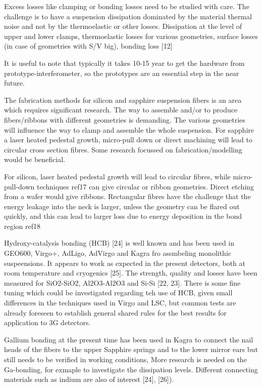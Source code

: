 Excess losses like clamping or bonding losses need to be studied with care. The challenge is to have a suspension dissipation dominated by the material thermal noise and not by the thermoelastic or other losses. Dissipation at the level of upper and lower clamps, thermoelastic losses for various geometries, surface losses (in case of geometries with S/V big), bonding loss [12]

It is useful to note that typically it takes 10-15 year to get the hardware from prototype-interferometer, so the prototypes are an essential step in the near future.

The fabrication methods for silicon and sapphire suspension fibers is an area which requires significant research. The way to assemble and/or to produce fibers/ribbons with different geometries is demanding. The various geometries will influence the way to clamp and assemble the whole suspension. For sapphire a laser heated pedestal growth, micro-pull down or direct machining will lead to circular cross section fibres. Some research focussed on fabrication/modelling would be beneficial.

For silicon, laser heated pedestal growth will lead to circular fibres, while micro-pull-down techniques ref17 can give circular or ribbon geometries. Direct etching from a wafer would give ribbons. Rectangular fibres have the challenge that the energy leakage into the neck is larger, unless the geometry can be flared out quickly, and this can lead to larger loss due to energy deposition in the bond region ref18


Hydroxy-catalysis bonding (HCB) [24] is well known and has been used in GEO600, Virgo+, AdLigo, AdVirgo and Kagra fro assmbeling monolithic suspeensions.  It appears to work as expected in the present detectors, both at room temperature and cryogenics [25]. The strength, quality and losses have been measured for SiO2-SiO2, Al2O3-Al2O3 and Si-Si [22, 23].   There is some fine tuning which could be investigated regarding teh use of HCB, given small differences in the techniques used in Virgo and LSC, but common tests are already foreseen to establish general shared rules for the best results for application to 3G detectors.

Gallium bonding at the present time has been used in Kagra to connect the nail heads of the fibers to the upper Sapphire springs and to the lower mirror ears but still needs to be verified in working conditions,  More research is needed on the Ga-bonding, for exmaple to  investigate the dissipation levels.  Different connecting materials such as indium are also of interest [24], [26]). 

